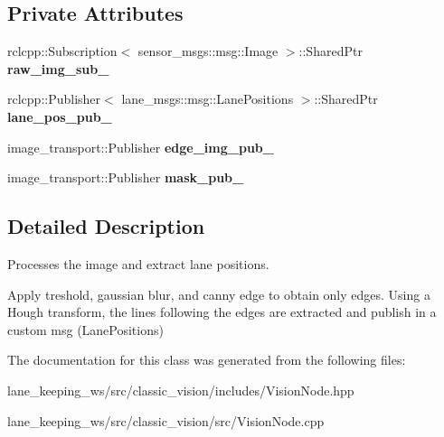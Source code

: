 \subsection*{Private Attributes}
\begin{DoxyCompactItemize}
\item 
\mbox{\label{classVisionNode_a7f2f6a8fc2898ec230d96a6df386f0ae}} 
rclcpp\+::\+Subscription$<$ sensor\+\_\+msgs\+::msg\+::\+Image $>$\+::Shared\+Ptr {\bfseries raw\+\_\+img\+\_\+sub\+\_\+}
\item 
\mbox{\label{classVisionNode_aa4563584d251d6a0d2a3442a083ba8f0}} 
rclcpp\+::\+Publisher$<$ lane\+\_\+msgs\+::msg\+::\+Lane\+Positions $>$\+::Shared\+Ptr {\bfseries lane\+\_\+pos\+\_\+pub\+\_\+}
\item 
\mbox{\label{classVisionNode_ab716281a28831e4e643d9ac14275a5d3}} 
image\+\_\+transport\+::\+Publisher {\bfseries edge\+\_\+img\+\_\+pub\+\_\+}
\item 
\mbox{\label{classVisionNode_a6ab1e698ad581462c57aa056ac3fd245}} 
image\+\_\+transport\+::\+Publisher {\bfseries mask\+\_\+pub\+\_\+}
\end{DoxyCompactItemize}


\subsection{Detailed Description}
Processes the image and extract lane positions. 

Apply treshold, gaussian blur, and canny edge to obtain only edges. Using a Hough transform, the lines following the edges are extracted and publish in a custom msg (Lane\+Positions) 

The documentation for this class was generated from the following files\+:\begin{DoxyCompactItemize}
\item 
lane\+\_\+keeping\+\_\+ws/src/classic\+\_\+vision/includes/Vision\+Node.\+hpp\item 
lane\+\_\+keeping\+\_\+ws/src/classic\+\_\+vision/src/Vision\+Node.\+cpp\end{DoxyCompactItemize}
